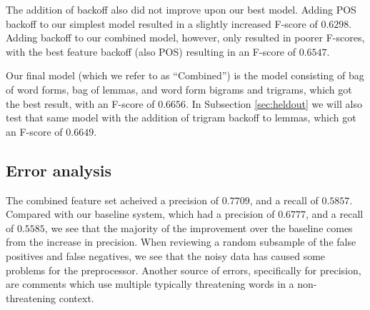 \documentclass[11pt,letterpaper]{article}
\begin{document}
The addition of backoff also did not improve upon our best model. Adding POS backoff to our simplest model resulted in a slightly increased F-score of $0.6298$. Adding backoff to our combined model, however, only resulted in poorer F-scores, with the best feature backoff (also POS) resulting in an F-score of $0.6547$.

Our final model (which we refer to as ``Combined'') is the model consisting of bag of word forms, bag of lemmas, and word form bigrams and trigrams, which got the best result, with an F-score of $0.6656$. In Subsection \ref{sec:heldout} we will also test that same model with the addition of trigram backoff to lemmas, which got an F-score of $0.6649$.






\subsection{Error analysis}

The combined feature set acheived a precision of $0.7709$, and a recall of $0.5857$. Compared with our baseline system, which had a precision of $0.6777$, and a recall of $0.5585$, we see that the majority of the improvement over the baseline comes from the increase in precision. When reviewing a random subsample of the false positives and false negatives, we see that the noisy data has caused some problems for the preprocessor. Another source of errors, specifically for precision, are comments which use multiple typically threatening words in a non-threatening context.


      
      
\end{document}
